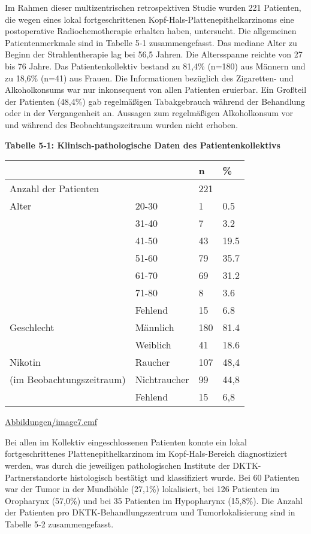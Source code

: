 Im Rahmen dieser multizentrischen retrospektiven Studie wurden 221 Patienten, die wegen eines lokal fortgeschrittenen Kopf-Hals-Plattenepithelkarzinoms eine postoperative Radiochemotherapie erhalten haben, untersucht. Die allgemeinen Patientenmerkmale sind in Tabelle 5‑1 zusammengefasst. Das mediane Alter zu Beginn der Strahlentherapie lag bei 56,5 Jahren. Die Altersspanne reichte von 27 bis 76 Jahre. Das Patientenkollektiv bestand zu 81,4\% (n=180) aus Männern und zu 18,6\% (n=41) aus Frauen. Die Informationen bezüglich des Zigaretten- und Alkoholkonsums war nur inkonsequent von allen Patienten eruierbar. Ein Großteil der Patienten (48,4\%) gab regelmäßigen Tabakgebrauch während der Behandlung oder in der Vergangenheit an. Aussagen zum regelmäßigen Alkoholkonsum vor und während des Beobachtungszeitraum wurden nicht erhoben.

\textbf{Tabelle 5‑1: Klinisch-pathologische Daten des Patientenkollektivs}

\begin{tablenos:no-prefix-table-caption}

\begin{longtable}[]{@{}llll@{}}
\toprule()
& & n & \% \\
\midrule()
\endhead
Anzahl der Patienten & & 221 & \\
Alter & 20-30 & 1 & 0.5 \\
& 31-40 & 7 & 3.2 \\
& 41-50 & 43 & 19.5 \\
& 51-60 & 79 & 35.7 \\
& 61-70 & 69 & 31.2 \\
& 71-80 & 8 & 3.6 \\
& Fehlend & 15 & 6.8 \\
Geschlecht & Männlich & 180 & 81.4 \\
& Weiblich & 41 & 18.6 \\
Nikotin & Raucher & 107 & 48,4 \\
(im Beobachtungszeitraum) & Nichtraucher & 99 & 44,8 \\
& Fehlend & 15 & 6,8 \\
\bottomrule()
\end{longtable}

\end{tablenos:no-prefix-table-caption}

\url{Abbildungen/image7.emf}

Bei allen im Kollektiv eingeschlossenen Patienten konnte ein lokal fortgeschrittenes Plattenepithelkarzinom im Kopf-Hals-Bereich diagnostiziert werden, was durch die jeweiligen pathologischen Institute der DKTK-Partnerstandorte histologisch bestätigt und klassifiziert wurde. Bei 60 Patienten war der Tumor in der Mundhöhle (27,1\%) lokalisiert, bei 126 Patienten im Oropharynx (57,0\%) und bei 35 Patienten im Hypopharynx (15,8\%). Die Anzahl der Patienten pro DKTK-Behandlungszentrum und Tumorlokalisierung sind in Tabelle 5‑2 zusammengefasst.

